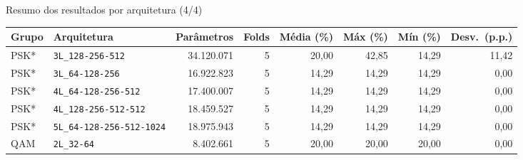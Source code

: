\documentclass[aspectratio=169,11pt]{beamer}
\begin{document}
\begin{frame}{Resumo dos resultados por arquitetura (4/4)}
  \centering
  \small
  \begin{adjustbox}{max width=\textwidth}
  \begin{tabular}{llrrrrrr}
    \toprule
    Grupo & Arquitetura & Parâmetros & Folds & Média (\%) & Máx (\%) & Mín (\%) & Desv.\ (p.p.) \\
    \midrule
    PSK* & \texttt{3L\_128-256-512} & 34.120.071 & 5 & 20,00 & 42,85 & 14,29 & 11,42 \\
    PSK* & \texttt{3L\_64-128-256} & 16.922.823 & 5 & 14,29 & 14,29 & 14,29 & 0,00 \\
    PSK* & \texttt{4L\_64-128-256-512} & 17.400.007 & 5 & 14,29 & 14,29 & 14,29 & 0,00 \\
    PSK* & \texttt{4L\_128-256-512-512} & 18.459.527 & 5 & 14,29 & 14,29 & 14,29 & 0,00 \\
    PSK* & \texttt{5L\_64-128-256-512-1024} & 18.975.943 & 5 & 14,29 & 14,29 & 14,29 & 0,00 \\
    QAM & \texttt{2L\_32-64} & 8.402.661 & 5 & 20,00 & 20,00 & 20,00 & 0,00 \\
    \bottomrule
  \end{tabular}
  \end{adjustbox}
  \par\vspace{2mm}{\scriptsize * dados do relatório (backups locais); não disponíveis no Drive.}
\end{frame}
\end{document}
